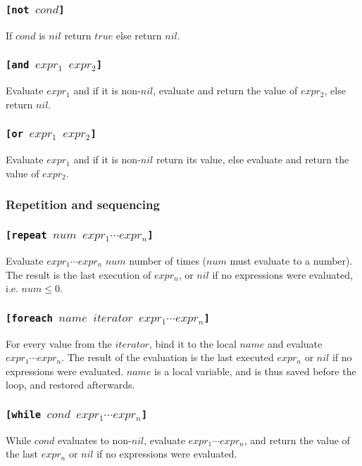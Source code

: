 \documentclass[11pt]{report}
\begin{document}
\subsubsection*{\tt{[not }$cond$\tt{]}}
If $cond$ is $nil$ return $true$ else return $nil$.

\subsubsection*{\tt{[and }$expr_1$ $expr_2$\tt{]}}
Evaluate $expr_1$ and if it is non-$nil$, evaluate and return the value of $expr_2$, else return $nil$.

\subsubsection*{\tt{[or }$expr_1$ $expr_2$\tt{]}}
Evaluate $expr_1$ and if it is non-$nil$ return its value, else evaluate and return the value of $expr_2$.

\subsubsection{Repetition and sequencing}
\subsubsection*{\tt{[repeat }$num$ $expr_1 \cdots expr_n$\tt{]}}
Evaluate $expr_1 \cdots expr_n$ $num$ number of times ($num$ must evaluate to a number). The result is the last execution of $expr_n$, or $nil$ if no expressions were evaluated, i.e. $num \leq 0$.

\subsubsection*{\tt{[foreach }$name$ $iterator$ $expr_1 \cdots expr_n$\tt{]}}
For every value from the $iterator$, bind it to the local $name$ and evaluate $expr_1 \cdots expr_n$. The result of the evaluation is the last executed $expr_n$ or $nil$ if no expressions were evaluated. $name$ is a local variable, and is thus saved before the loop, and restored afterwards.

\subsubsection*{\tt{[while }$cond$ $expr_1 \cdots expr_n$\tt{]}}
While $cond$ evaluates to non-$nil$, evaluate $expr_1 \cdots expr_n$, and return the value of the last $expr_n$ or $nil$ if no expressions were evaluated.
\end{document}
